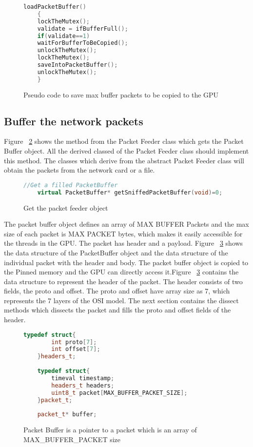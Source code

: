 \begin{figure}[h]
	\centering
	\begin{lstlisting}[frame=none,language=C++] 
	loadPacketBuffer()
	{
	lockTheMutex();
	validate = ifBufferFull();
	if(validate==1)
	waitForBufferToBeCopied();
	unlockTheMutex();
	lockTheMutex();
	saveIntoPacketBuffer();
	unlockTheMutex();
	}
	\end{lstlisting}
	\caption{Pseudo code to save max buffer packets to be copied to the GPU}
\label{fig:packetfeeder}
\end{figure}

\subsection{Buffer the network packets}
Figure ~\ref{fig:getpacketbuffer} shows the method from the Packet Feeder class which gets the Packet Buffer object. All the derived classed of the Packet Feeder class should implement this method. The classes which derive from the abstract Packet Feeder class will obtain the packets from the network card or a file.

\begin{figure}
	\centering
	\begin{lstlisting}[frame=none,language=C++] 
	//Get a filled PacketBuffer
	virtual PacketBuffer* getSniffedPacketBuffer(void)=0;
	\end{lstlisting}
	\caption{Get the packet feeder object \cite{bib3}}
	\label{fig:getpacketbuffer}
\end{figure}

The packet buffer object defines an array of MAX BUFFER Packets and the max size of each packet is MAX PACKET bytes, which makes it easily accessible for the threads in the GPU. The packet has header and a payload. Figure ~\ref{fig:packetbuffer} shows the data structure of the PacketBuffer object and the data structure of the individual packet with the header and body.
The packet buffer object is copied to the Pinned memory and the GPU can directly access it.Figure ~\ref{fig:packetbuffer} contains the data structure to represent the header of the packet. The header consists of two fields, the proto and offset. The proto and offset have array size as 7, which represents the 7 layers of the OSI model. The next section contains the dissect methods which dissects the packet and fills the proto and offset fields of the header.

\begin{figure}
	\centering
	\begin{lstlisting}[frame=none,language=C++] 
	typedef struct{
		int proto[7];
		int offset[7];		
	}headers_t;
	
	typedef struct{
		timeval timestamp;
		headers_t headers;
		uint8_t packet[MAX_BUFFER_PACKET_SIZE];
	}packet_t;
	
	packet_t* buffer;
	\end{lstlisting}
	\caption{Packet Buffer is a pointer to a packet which is an array of MAX_BUFFER_PACKET size\cite{bib3}}
	\label{fig:packetbuffer}
\end{figure}



